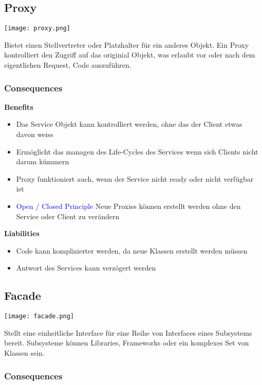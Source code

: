 \subsection{Proxy}

\texttt{[image: proxy.png]}

Bietet einen Stellvertreter oder Platzhalter für ein anderes Objekt. Ein Proxy kontrolliert den Zugriff auf das originial Objekt, was erlaubt vor oder nach dem eigentlichen Request, Code auszuführen.

\subsubsection{Consequences}

\textbf{Benefits}
\begin{itemize}
    \item Das Service Objekt kann kontrolliert werden, ohne das der Client etwas davon weiss
    \item Ermöglicht das managen des Life-Cycles des Services wenn sich Clients nicht darum kümmern
    \item Proxy funktioniert auch, wenn der Service nicht ready oder nicht verfügbar ist
    \item \textcolor{blue}{Open / Closed Principle} Neue Proxies können erstellt werden ohne den Service oder Client zu verändern
\end{itemize}
\vspace{10pt}
\textbf{Liabilities}

\begin{itemize}
    \item Code kann komplizierter werden, da neue Klassen erstellt werden müssen
    \item Antwort des Services kann verzögert werden
\end{itemize}

\subsection{Facade}

\texttt{[image: facade.png]}

Stellt eine einheitliche Interface für eine Reihe von Interfaces eines Subsystems bereit. Subsysteme können Libraries, Frameworks oder ein komplexes Set von Klassen sein.

\subsubsection{Consequences}

